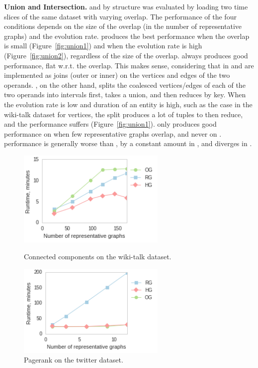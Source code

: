 {\bf Union and Intersection.}   and 
by structure was evaluated by loading two time slices of the same
dataset with varying overlap.  The performance of the four conditions
depends on the size of the overlap (in the number of representative
graphs) and the evolution rate.  \ve produces the best performance
when the overlap is small (Figure~\ref{fig:union1}) and when the
evolution rate is high (Figure~\ref{fig:union2}), regardless of the
size of the overlap.  \og always produces good performance, flat
w.r.t. the overlap.  This makes sense, considering that in \og
{} and  are implemented as joins (outer
or inner) on the vertices and edges of the two operands.  \ve, on the
other hand, splits the coalesced vertices/edges of each of the two
operands into intervals first, takes a union, and then reduces by key.
When the evolution rate is low and duration of an entity is high, such
as the case in the wiki-talk dataset for vertices, the split produces a
lot of tuples to then reduce, and the performance suffers
(Figure~\ref{fig:union1}). \sg only produces good performance on
 when few representative graphs overlap, and never
on . \hg performance is generally worse than \og, by a
constant amount in , and diverges in
.

\begin{figure}[h]
\centering
\begin{minipage}{3.3in}
\centering
\includegraphics[width=2.8in]{figs/cc_wikitalk_build12.png}
\caption{Connected components on the wiki-talk dataset.}
\label{fig:ccwiki}
\end{minipage}
\begin{minipage}{3.3in}
\centering
\includegraphics[width=2.8in]{figs/prank_twitter_build12.png}
\caption{Pagerank on the twitter dataset.}
\label{fig:pranktwitter}
\end{minipage}
\end{figure}

